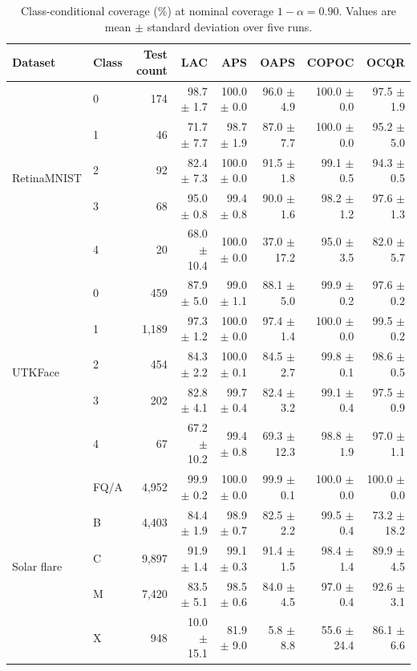 \documentclass[conference]{IEEEtran}
\begin{document}
\begin{table}[t]
\centering
\caption{Class-conditional coverage (\%) at nominal coverage \(1-\alpha=0.90\).
Values are mean \(\pm\) standard deviation over five runs.}
\label{tab:per_class_all}
\begin{tabular}{llrrrrrr}
\toprule
Dataset & Class & Test count & LAC & APS & OAPS & COPOC & OCQR \\
\midrule

\multirow{5}{*}{RetinaMNIST}
& 0 & 174 & 98.7 $\pm$ 1.7 & 100.0 $\pm$ 0.0 & 96.0 $\pm$ 4.9 & 100.0 $\pm$ 0.0 & 97.5 $\pm$ 1.9 \\
& 1 & 46  & 71.7 $\pm$ 7.7 & 98.7 $\pm$ 1.9 & 87.0 $\pm$ 7.7 & 100.0 $\pm$ 0.0 & 95.2 $\pm$ 5.0 \\
& 2 & 92  & 82.4 $\pm$ 7.3 & 100.0 $\pm$ 0.0 & 91.5 $\pm$ 1.8 & 99.1 $\pm$ 0.5 & 94.3 $\pm$ 0.5 \\
& 3 & 68  & 95.0 $\pm$ 0.8 & 99.4 $\pm$ 0.8 & 90.0 $\pm$ 1.6 & 98.2 $\pm$ 1.2 & 97.6 $\pm$ 1.3 \\
& 4 & 20  & 68.0 $\pm$ 10.4 & 100.0 $\pm$ 0.0 & 37.0 $\pm$ 17.2 & 95.0 $\pm$ 3.5 & 82.0 $\pm$ 5.7 \\
\midrule

\multirow{5}{*}{UTKFace}
& 0 & 459 & 87.9 $\pm$ 5.0 & 99.0 $\pm$ 1.1 & 88.1 $\pm$ 5.0 & 99.9 $\pm$ 0.2 & 97.6 $\pm$ 0.2 \\
& 1 & 1{,}189 & 97.3 $\pm$ 1.2 & 100.0 $\pm$ 0.0 & 97.4 $\pm$ 1.4 & 100.0 $\pm$ 0.0 & 99.5 $\pm$ 0.2 \\
& 2 & 454 & 84.3 $\pm$ 2.2 & 100.0 $\pm$ 0.1 & 84.5 $\pm$ 2.7 & 99.8 $\pm$ 0.1 & 98.6 $\pm$ 0.5 \\
& 3 & 202 & 82.8 $\pm$ 4.1 & 99.7 $\pm$ 0.4 & 82.4 $\pm$ 3.2 & 99.1 $\pm$ 0.4 & 97.5 $\pm$ 0.9 \\
& 4 & 67  & 67.2 $\pm$ 10.2 & 99.4 $\pm$ 0.8 & 69.3 $\pm$ 12.3 & 98.8 $\pm$ 1.9 & 97.0 $\pm$ 1.1 \\
\midrule

\multirow{5}{*}{Solar flare}
& FQ/A & 4{,}952 & 99.9 $\pm$ 0.2 & 100.0 $\pm$ 0.0 & 99.9 $\pm$ 0.1 & 100.0 $\pm$ 0.0 & 100.0 $\pm$ 0.0 \\
& B & 4{,}403 & 84.4 $\pm$ 1.9 & 98.9 $\pm$ 0.7 & 82.5 $\pm$ 2.2 & 99.5 $\pm$ 0.4 & 73.2 $\pm$ 18.2 \\
& C & 9{,}897 & 91.9 $\pm$ 1.4 & 99.1 $\pm$ 0.3 & 91.4 $\pm$ 1.5 & 98.4 $\pm$ 1.4 & 89.9 $\pm$ 4.5 \\
& M & 7{,}420 & 83.5 $\pm$ 5.1 & 98.5 $\pm$ 0.6 & 84.0 $\pm$ 4.5 & 97.0 $\pm$ 0.4 & 92.6 $\pm$ 3.1 \\
& X & 948 & 10.0 $\pm$ 15.1 & 81.9 $\pm$ 9.0 & 5.8 $\pm$ 8.8 & 55.6 $\pm$ 24.4 & 86.1 $\pm$ 6.6 \\
\bottomrule
\end{tabular}
\end{table}
\end{document}
